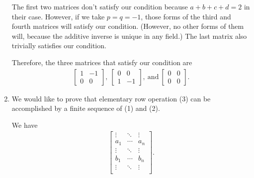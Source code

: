 \documentclass[12pt]{article}
\begin{document}
\begin{enumerate}
      The first two matrices don't satisfy our condition because
      $a + b + c + d = 2$ in their case. However, if we take $p =
      q = -1$, those forms of the third and fourth matrices will
      satisfy our condition. (However, no other forms of them
      will, because the additive inverse is unique in any field.)
      The last matrix also trivially satisfies our condition.

      Therefore, the three matrices that satisfy our condition
      are
      \begin{align*}
        \begin{bmatrix}
           1 & -1\\
           0 & 0
        \end{bmatrix},\ 
        \begin{bmatrix}
           0 & 0\\
           1 & -1
        \end{bmatrix},\ \text{and}\ 
        \begin{bmatrix}
           0 & 0\\
           0 & 0
        \end{bmatrix}.
      \end{align*}

    \item
      We would like to prove that elementary row operation (3)
      can be accomplished by a finite sequence of (1) and (2).

      We have
      \begin{align*}
        \begin{bmatrix}
          \vdots   & \ddots & \vdots\\
          a_1 & \cdots & a_n\\
          \vdots   & \ddots & \vdots\\
          b_1 & \cdots & b_n\\
          \vdots   & \ddots & \vdots\\
        \end{bmatrix}.
      \end{align*}


\end{enumerate}
\end{document}
